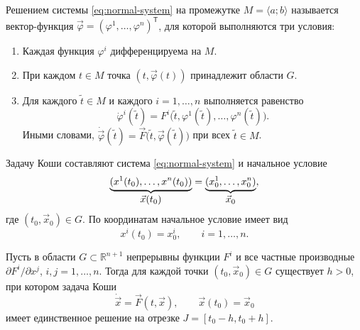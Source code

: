 \documentclass[12pt,a4paper]{article}
\numberwithin{equation}{section}
\newcommand{\R}{\mathbb{R}}
\newcommand{\vect}[1]{\vec{#1}}
\begin{document}
\begin{definitionHSE}
Решением системы \eqref{eq:normal-system} на промежутке $M=\langle a;b\rangle$
называется вектор-функция $\vect{\varphi}=(\varphi^1,\ldots,\varphi^n)^{\mathsf T}$,
для которой выполняются три условия:
\begin{enumerate}
\item Каждая функция $\varphi^i$ дифференцируема на $M$.
\item При каждом $t\in M$ точка $(t,\vect{\varphi}(t))$ принадлежит области $G$.
\item Для каждого $\widetilde t\in M$ и каждого $i=1,\ldots,n$ выполняется равенство
\[
 \dot{\varphi}^i(\widetilde t)
 = F^i\bigl(\widetilde t,\varphi^1(\widetilde t),\ldots,\varphi^n(\widetilde t)\bigr).
\]
Иными словами, $\dot{\vect{\varphi}}(\widetilde t)
=\vect F\bigl(\widetilde t,\vect{\varphi}(\widetilde t)\bigr)$ при всех $\widetilde t\in M$.
\end{enumerate}
\end{definitionHSE}

\begin{definitionHSE}
Задачу Коши составляют система \eqref{eq:normal-system} и начальное условие
\[\underbrace{(x^1(t_0),\ldots,x^n(t_0))}_{\textstyle\mathstrut\vect{x}(t_0)}=\underbrace{(x_0^1,\ldots,x_0^n)}_{\textstyle\mathstrut\vect{x}_0},\]
где $(t_0,\vect{x}_0)\in G$. По координатам начальное условие имеет вид
\[
x^i(t_0)=x_0^i,\qquad i=1,\ldots,n.
\]
\end{definitionHSE}

\begin{theoremHSE}
Пусть в области $G\subset\R^{n+1}$ непрерывны функции $F^i$ и все
частные производные $\partial F^i/\partial x^j$, $i,j=1,\ldots,n$.
Тогда для каждой точки $(t_0,\vect{x}_0)\in G$ существует $h>0$,
при котором задача Коши
\[
 \dot{\vect{x}}=\vect F(t,\vect{x}),\qquad \vect{x}(t_0)=\vect{x}_0
\]
имеет единственное решение на отрезке $J=[t_0-h,t_0+h]$.
\end{theoremHSE}

\end{document}
